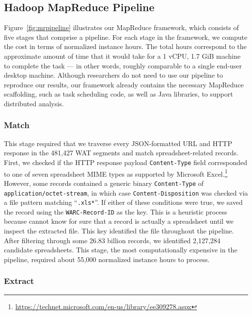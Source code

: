 \documentclass[conference]{IEEEtran}
\begin{document}
 

\subsection{Hadoop MapReduce Pipeline}

Figure~\ref{fig:mrpipeline} illustrates our MapReduce framework, which consists of five stages that comprise a pipeline. For each stage in the framework, we compute the cost in terms of normalized instance hours. The total hours correspond to the approximate amount of time that it would take for a 1 vCPU, 1.7 GiB machine to complete the task --- in other words, roughly comparable to a single end-user desktop machine.  Although researchers do not need to use our pipeline to reproduce our results, our framework already contains the necessary MapReduce scaffolding, such as task scheduling code, as well as Java libraries, to support distributed analysis.

\subsubsection{Match} 

This stage required that we traverse every JSON-formatted URL and HTTP response in the 481,427 WAT segments and match spreadsheet-related records. First, we checked if the HTTP response payload \texttt{Content-Type} field corresponded to one of seven spreadsheet MIME types as supported by Microsoft Excel.\footnote{\url{https://technet.microsoft.com/en-us/library/ee309278.aspx}} However, some records contained a generic binary \texttt{Content-Type} of \texttt{application/octet-stream}, in which case \texttt{Content-Disposition} was checked via a file pattern matching ``\texttt{.xls*}''. If either of these conditions were true, we saved the record using the \texttt{WARC-Record-ID} as the key. This is a heuristic process because cannot know for sure that a record is actually a spreadsheet until we inspect the extracted file. This key identified the file throughout the pipeline. After filtering through some 26.83 billion records, we identified 2,127,284 candidate spreadsheets. This stage, the most computationally expensive in the pipeline, required about 55,000 normalized instance hours to process.

\subsubsection{Extract} 
\end{document}
